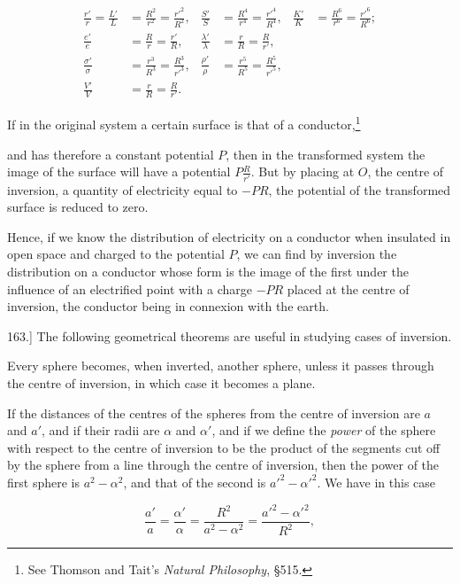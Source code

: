 \documentclass[11pt,a4paper]{article}
\begin{document}
\begin{equation}\tag{18}
\begin{aligned}
\frac{r'}{r}=\frac{L'}{L}
  &=\frac{R^2}{r^2}=\frac{r'^2}{R^2},&
\frac{S'}{S}
  &=\frac{R^4}{r^4}=\frac{r'^4}{R^4},&
\frac{K'}{K}
  &=\frac{R^6}{r^6}=\frac{r'^6}{R^6};\\
\frac{e'}{e}
  &=\frac{R}{r}=\frac{r'}{R},&
\frac{\lambda'}{\lambda}
  &=\frac{r}{R}=\frac{R}{r'},\\
\frac{\sigma'}{\sigma}
  &=\frac{r^3}{R^3}=\frac{R^3}{r'^3},&
\frac{\rho'}{\rho}
  &=\frac{r^5}{R^5}=\frac{R^5}{r'^5},\\
\frac{V'}{V}
  &=\frac{r}{R}=\frac{R}{r'}.
\end{aligned}
\end{equation}

If in the original system a certain surface is that of a conductor,\footnote{See Thomson and Tait's \textit{Natural Philosophy}, \S 515.}

and has therefore a constant potential $P$, then in the transformed
system the image of the surface will have a potential $P\frac{R}{r'}$.
But by placing at $O$, the centre of inversion, a quantity of
electricity equal to $-PR$, the potential of the transformed surface is
reduced to zero.

Hence, if we know the distribution of electricity on a conductor when
insulated in open space and charged to the potential $P$, we can find
by inversion the distribution on a conductor whose form is the image of
the first under the influence of an electrified point with a charge
$-PR$ placed at the centre of inversion, the conductor being in
connexion with the earth.

163.] The following geometrical theorems are useful in studying cases of inversion.

Every sphere becomes, when inverted, another sphere, unless it passes through the centre of inversion, in which case it becomes a plane.

If the distances of the centres of the spheres from the centre of
inversion are $a$ and $a'$, and if their radii are $\alpha$ and
$\alpha'$, and if we define the \textit{power} of the sphere with
respect to the centre of inversion to be the product of the segments
cut off by the sphere from a line through the centre of inversion, then
the power of the first sphere is $a^2-\alpha^2$, and that of the second
is $a'^2-\alpha'^2$. We have in this case

\begin{equation}\tag{19}
\frac{a'}{a}
=\frac{\alpha'}{\alpha}
=\frac{R^2}{a^2-\alpha^2}
=\frac{a'^2-\alpha'^2}{R^2},
\end{equation}
\end{document}
